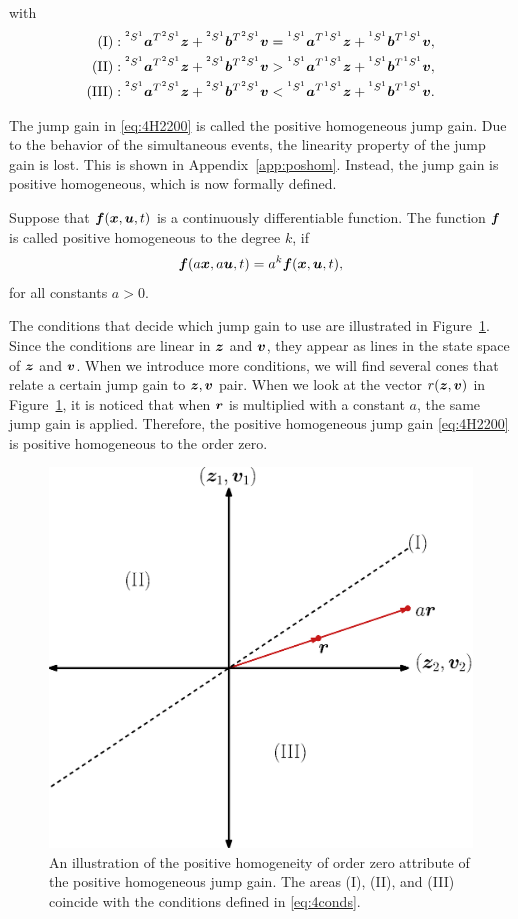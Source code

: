 \documentclass[../DC2017114Bouma.tex]{subfiles}
\begin{document}
with
\begin{align}
(\text{I})&:\hspace{0cm}^{^2 S^1}{\boldsymbol{a}}^T\hspace{0cm}^{^2 S^1}{\boldsymbol{z}} +\hspace{0cm}^{^2 S^1}{\boldsymbol{b}}^T\hspace{0cm}^{^2 S^1}{\boldsymbol{v}} = \hspace{0cm}^{^1 S^1}{\boldsymbol{a}}^T\hspace{0cm}^{^1 S^1}{\boldsymbol{z}} +\hspace{0cm}^{^1 S^1}{\boldsymbol{b}}^T\hspace{0cm}^{^1 S^1}{\boldsymbol{v}},\\
(\text{II})&:\hspace{0cm}^{^2 S^1}{\boldsymbol{a}}^T\hspace{0cm}^{^2 S^1}{\boldsymbol{z}} +\hspace{0cm}^{^2 S^1}{\boldsymbol{b}}^T\hspace{0cm}^{^2 S^1}{\boldsymbol{v}} > \hspace{0cm}^{^1 S^1}{\boldsymbol{a}}^T\hspace{0cm}^{^1 S^1}{\boldsymbol{z}} +\hspace{0cm}^{^1 S^1}{\boldsymbol{b}}^T\hspace{0cm}^{^1 S^1}{\boldsymbol{v}},\\
(\text{III})&:\hspace{0cm}^{^2 S^1}{\boldsymbol{a}}^T\hspace{0cm}^{^2 S^1}{\boldsymbol{z}} +\hspace{0cm}^{^2 S^1}{\boldsymbol{b}}^T\hspace{0cm}^{^2 S^1}{\boldsymbol{v}} < \hspace{0cm}^{^1 S^1}{\boldsymbol{a}}^T\hspace{0cm}^{^1 S^1}{\boldsymbol{z}} +\hspace{0cm}^{^1 S^1}{\boldsymbol{b}}^T\hspace{0cm}^{^1 S^1}{\boldsymbol{v}}.\label{eq:4conds}
\end{align}

The jump gain in \eqref{eq:4H2200} is called the positive homogeneous jump gain. Due to the behavior of the simultaneous events, the linearity property of the jump gain is lost. This is shown in Appendix~\ref{app:poshom}. Instead, the jump gain is positive homogeneous, which is now formally defined.
 
\begin{mydef}
Suppose that ${\boldsymbol{f}}({\boldsymbol{x}},{\boldsymbol{u}},t)$ is a continuously differentiable function. The function ${\boldsymbol{f}}$ is called positive homogeneous to the degree $k$, if 
\begin{align}
{\boldsymbol{f}}(a{\boldsymbol{x}},a{\boldsymbol{u}},t) = a^k{\boldsymbol{f}}({\boldsymbol{x}},{\boldsymbol{u}},t),
\end{align}
for all constants $a>0$.
\end{mydef}

The conditions that decide which jump gain to use are illustrated in Figure~\ref{fig:4cone}. Since the conditions are linear in ${\boldsymbol{z}}$ and ${\boldsymbol{v}}$, they appear as lines in the state space of ${\boldsymbol{z}}$ and ${\boldsymbol{v}}$. When we introduce more conditions, we will find several cones that relate a certain jump gain to ${\boldsymbol{z}},{\boldsymbol{v}}$ pair. When we look at the vector $r({\boldsymbol{z}},{\boldsymbol{v}})$ in Figure~\ref{fig:4cone}, it is noticed that when ${\boldsymbol{r}}$ is multiplied with a constant $a$, the same jump gain is applied. Therefore, the positive homogeneous jump gain \eqref{eq:4H2200} is positive homogeneous to the order zero.

\begin{figure}[H]
\centering
\includegraphics[width=.5\textwidth]{4cone.eps}\caption{An illustration of the positive homogeneity of order zero attribute of the positive homogeneous jump gain. The areas \textnormal{(I)}, \textnormal{(II)}, and \textnormal{(III)} coincide with the conditions defined in \eqref{eq:4conds}.}\label{fig:4cone}
\end{figure}
\end{document}
